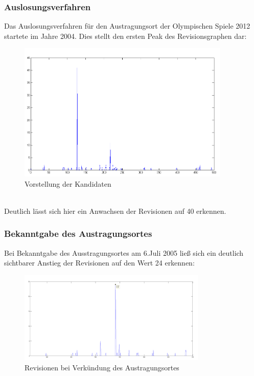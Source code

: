 \documentclass[pagesize=auto, titlepage=on]{scrartcl}
\begin{document}
\subsubsection{Auslosungsverfahren}
Das Auslosungsverfahren für den Austragungsort der Olympischen Spiele 2012 startete im Jahre 2004. Dies stellt den ersten Peak des Revisionsgraphen dar:
\begin{figure}[htb]
  \centering
     \includegraphics*[width=0.9\textwidth]{images/kandidaten2004.png}
   \caption[Kandidaten]{Vorstellung der Kandidaten}
   \label{fig:nag_conf}
\end{figure}
\\Deutlich lässt sich hier ein Anwachsen der Revisionen auf 40 erkennen.
\clearpage
\subsubsection{Bekanntgabe des Austragungsortes}
Bei Bekanntgabe des Ausstragungsortes am 6.Juli 2005 ließ sich ein deutlich sichtbarer Anstieg der Revisionen auf den Wert 24 erkennen:
\begin{figure}[htb]
  \centering
     \includegraphics*[width=0.8\textwidth]{images/entscheidung06-07-2005.png}
   \caption[Austragungsort]{Revisionen bei Verkündung des Austragungsortes}
   \label{fig:nag_conf}
\end{figure}
\end{document}
